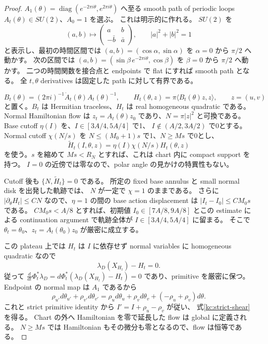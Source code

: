 \begin{proof}
$A_1(\theta)=\operatorname{diag}(e^{-2\pi i\theta},e^{2\pi i\theta})$ へ至る
smooth path of periodic loops $A_t(\theta)\in SU(2)$、$A_0=1$ を選ぶ。
これは明示的に作れる。
$SU(2)$ を
\[
 (a,b)\longmapsto
 \begin{pmatrix}a&b\\-\bar b&\bar a\end{pmatrix},
 \qquad |a|^2+|b|^2=1
\]
と表示し、最初の時間区間では $(a,b)=(\cos\alpha,\sin\alpha)$ を
$\alpha=0$ から $\pi/2$ へ動かす。
次の区間では $(a,b)=(\sin\beta\,e^{-2\pi i\theta},\cos\beta)$ を
$\beta=0$ から $\pi/2$ へ動かす。
二つの時間関数を接合点と endpoints で flat にすれば smooth path となる。
全 $t,\theta$ derivatives は固定した path に対して有界である。

\[
 B_t(\theta)=(2\pi i)^{-1}\dot A_t(\theta)A_t(\theta)^{-1},
 \qquad H_t(\theta,z)=\pi\langle B_t(\theta)z,z\rangle,
 \qquad z=(u,v)
\]
と置く。$B_t$ は Hermitian traceless、$H_t$ は real homogeneous quadratic である。
Normal Hamiltonian flow は $z_t=A_t(\theta)z_0$ であり、$N=\pi|z|^2$ と可換である。
Base cutoff $\eta(I)$ を、$I\in[3A/4,5A/4]$ で1、
$I\notin(A/2,3A/2)$ で0とする。
Normal cutoff $\chi(N/s)$ を $N\le(M_0+1)s$ で1、$N\ge Ms$ で0とし、
\begin{equation}\label{kc:suspended-hamiltonian}
 \widetilde H_t(I,\theta,z)
   =\eta(I)\chi(N/s)H_t(\theta,z)
\end{equation}
を使う。$s$ を縮めて $Ms<R_N$ とすれば、これは chart 内に compact support を持つ。
$I=0$ の近傍では零なので、polar angle の見かけの特異性もない。

Cutoff 後も $\{N,\widetilde H_t\}=0$ である。
所定の fixed base annulus と small normal disk を出発した軌跡では、
$N$ が一定で $\chi=1$ のままである。
さらに $|\partial_\theta H_t|\le C N$ なので、$\eta=1$ の間の base action displacement は
$|I_t-I_0|\le CM_0s$ である。
$CM_0s<A/8$ とすれば、初期値 $I_0\in[7A/8,9A/8]$ とこの estimate による
continuation argument で軌跡全体が $I\in[3A/4,5A/4]$ に留まる。
そこで $\theta_t=\theta_0$、$z_t=A_t(\theta_0)z_0$ が厳密に成立する。

この plateau 上では $H_t$ は $I$ に依存せず normal variables に homogeneous quadratic なので
\[
 \lambda_D(X_{H_t})-H_t=0.
\]
従って $\frac{d}{dt}\Phi_t^*\lambda_D
=d\Phi_t^*(\lambda_D(X_{H_t})-H_t)=0$ であり、primitive を厳密に保つ。
Endpoint の normal map は $A_1$ であるから
\[
 \rho_{u'}d\theta_{u'}+\rho_{v'}d\theta_{v'}
 =\rho_ud\theta_u+\rho_vd\theta_v+(-\rho_u+\rho_v)d\theta.
\]
これと strict primitive identity から $I'=I+\rho_u-\rho_v$ が従い、
式\eqref{kc:strict-shear}を得る。
Chart の外へ Hamiltonian を零で延長した flow は global に定義される。
$N\ge Ms$ では Hamiltonian もその微分も零となるので、flow は恒等である。
\end{proof}

